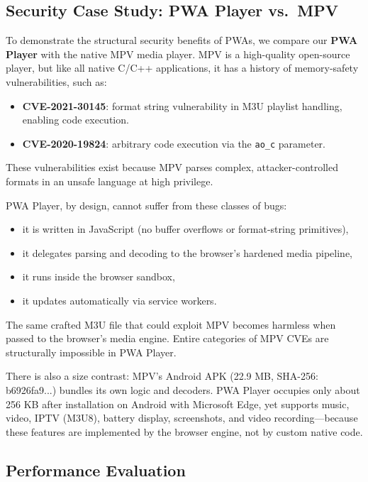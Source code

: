 \subsection{Security Case Study: PWA Player vs.\ MPV}

To demonstrate the structural security benefits of PWAs, we compare our \textbf{PWA Player} with the native MPV media player. MPV is a high-quality open-source player, but like all native C/C++ applications, it has a history of memory-safety vulnerabilities, such as:

\begin{itemize}
    \item \textbf{CVE-2021-30145}: format string vulnerability in M3U playlist handling, enabling code execution.
    \item \textbf{CVE-2020-19824}: arbitrary code execution via the \texttt{ao\_c} parameter.
\end{itemize}

These vulnerabilities exist because MPV parses complex, attacker-controlled formats in an unsafe language at high privilege.

PWA Player, by design, cannot suffer from these classes of bugs:

\begin{itemize}
    \item it is written in JavaScript (no buffer overflows or format-string primitives),
    \item it delegates parsing and decoding to the browser’s hardened media pipeline,
    \item it runs inside the browser sandbox,
    \item it updates automatically via service workers.
\end{itemize}

The same crafted M3U file that could exploit MPV becomes harmless when passed to the browser’s media engine. Entire categories of MPV CVEs are structurally impossible in PWA Player.

There is also a size contrast: MPV’s Android APK (22.9 MB, SHA-256: b6926fa9...) bundles its own logic and decoders. PWA Player occupies only about 256 KB after installation on Android with Microsoft Edge, yet supports music, video, IPTV (M3U8), battery display, screenshots, and video recording—because these features are implemented by the browser engine, not by custom native code.

\subsection{Performance Evaluation}

